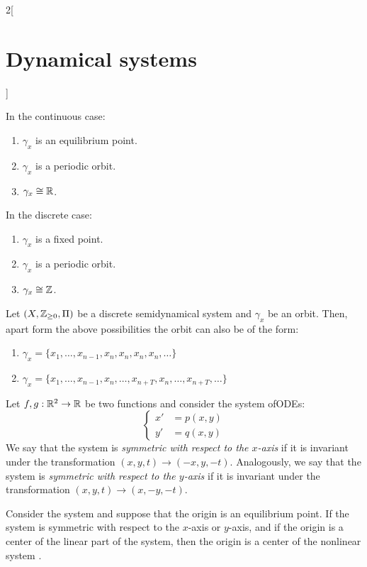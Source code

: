 \documentclass[../../../main_math.tex]{subfiles}
\begin{document}
\begin{multicols}{2}[\section{Dynamical systems}]
\begin{theorem}
    In the continuous case:
    \begin{enumerate}
      \item $\gamma_x$ is an equilibrium point.
      \item $\gamma_x$ is a periodic orbit.
      \item $\gamma_x\cong\mathbb{R}$.
    \end{enumerate}
    In the discrete case:
    \begin{enumerate}
      \item $\gamma_x$ is a fixed point.
      \item $\gamma_x$ is a periodic orbit.
      \item $\gamma_x\cong\mathbb{Z}$.
    \end{enumerate}
  \end{theorem}
  \begin{theorem}
    Let $(X,\mathbb{Z}_{\geq 0},\Pi)$ be a discrete semidynamical system and $\gamma_x$ be an orbit. Then, apart form the above possibilities the orbit can also be of the form:
    \begin{enumerate}
      \item $\gamma_x=\{x_1,\ldots,x_{n-1},x_n,x_n,x_n,x_n,\ldots\}$
      \item $\gamma_x=\{x_1,\ldots,x_{n-1},x_n,\ldots,x_{n+T},x_n,\ldots,x_{n+T},\ldots\}$
    \end{enumerate}
  \end{theorem}
  \begin{definition}
    Let $f,g:\mathbb{R}^2\rightarrow\mathbb{R}$ be two functions and consider the system ofODEs:
    \begin{equation}\label{DS:plane}
      \left\{
      \begin{aligned}
        x' & =p(x,y) \\
        y' & =q(x,y)
      \end{aligned}
      \right.
    \end{equation}
    We say that the system is \emph{symmetric with respect to the $x$-axis} if it is invariant under the transformation $(x,y,t)\rightarrow(-x,y,-t)$. Analogously, we say that the system is \emph{symmetric with respect to the $y$-axis} if it is invariant under the transformation $(x,y,t)\rightarrow(x,-y,-t)$.
  \end{definition}
  \begin{theorem}
    Consider the system  and suppose that the origin is an equilibrium point. If the system is symmetric with respect to the $x$-axis or $y$-axis, and if the origin is a center of the linear part of the system, then the origin is a center of the nonlinear system .

\end{theorem}
\end{multicols}
\end{document}
